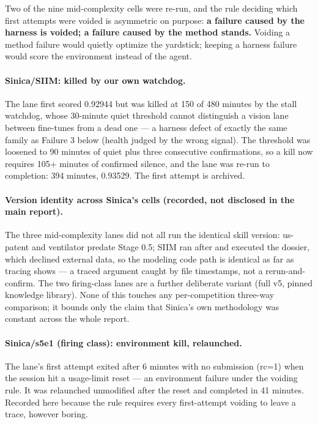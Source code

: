 \documentclass[11pt,a4paper]{article}
\begin{document}
Two of the nine mid-complexity cells were re-run, and the rule deciding which first attempts
were voided is asymmetric on purpose: \textbf{a failure caused by the harness is voided; a
failure caused by the method stands.} Voiding a method failure would quietly optimize the
yardstick; keeping a harness failure would score the environment instead of the agent.

\paragraph{Sinica/SIIM: killed by our own watchdog.} The lane first scored 0.92944 but was
killed at 150 of 480 minutes by the stall watchdog, whose 30-minute quiet threshold cannot
distinguish a vision lane between fine-tunes from a dead one --- a harness defect of exactly
the same family as Failure 3 below (health judged by the wrong signal). The threshold was
loosened to 90 minutes of quiet plus three consecutive confirmations, so a kill now requires
105+ minutes of confirmed silence, and the lane was re-run to completion: 394 minutes,
0.93529. The first attempt is archived.

\paragraph{Version identity across Sinica's cells (recorded, not disclosed in the main
report).} The three mid-complexity lanes did not all run the identical skill version: us-patent
and ventilator predate Stage 0.5; SIIM ran after and executed the dossier, which declined
external data, so the modeling code path is identical as far as tracing shows --- a traced
argument caught by file timestamps, not a rerun-and-confirm. The two firing-class lanes are a
further deliberate variant (full v5, pinned knowledge library). None of this touches any
per-competition three-way comparison; it bounds only the claim that Sinica's own methodology
was constant across the whole report.

\paragraph{Sinica/s5e1 (firing class): environment kill, relaunched.} The lane's first
attempt exited after 6 minutes with no submission (rc=1) when the session hit a usage-limit
reset --- an environment failure under the voiding rule. It was relaunched unmodified after
the reset and completed in 41 minutes. Recorded here because the rule requires every
first-attempt voiding to leave a trace, however boring.
\end{document}
